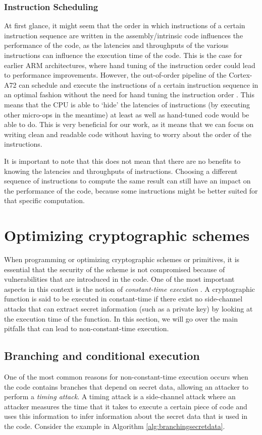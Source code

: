 \documentclass[11pt,a4paper]{report}
\theoremstyle{definition}
\begin{document}
\subsubsection{Instruction Scheduling}
At first glance, it might seem that the order in which instructions of a certain instruction sequence are written in the assembly/intrinsic code influences the performance of the code, as the latencies and throughputs of the various instructions can influence the execution time of the code. This is the case for earlier ARM architectures, where hand tuning of the instruction order could lead to performance improvements. However, the out-of-order pipeline of the Cortex-A72 can schedule and execute the instructions of a certain instruction sequence in an optimal fashion without the need for hand tuning the instruction order \cite{CortexA72OptGuide}. This means that the CPU is able to `hide' the latencies of instructions (by executing other micro-ops in the meantime) at least as well as hand-tuned code would be able to do. This is very beneficial for our work, as it means that we can focus on writing clean and readable code without having to worry about the order of the instructions.

It is important to note that this does not mean that there are no benefits to knowing the latencies and throughputs of instructions. Choosing a different sequence of instructions to compute the same result can still have an impact on the performance of the code, because some instructions might be better suited for that specific computation.

\section{Optimizing cryptographic schemes}
\label{sec:optimizingcrypto}
When programming or optimizing cryptographic schemes or primitives, it is essential that the security of the scheme is not compromised because of vulnerabilities that are introduced in the code. One of the most important aspects in this context is the notion of \textit{constant-time execution} \cite{kocher1996timing}. A cryptographic function is said to be executed in constant-time if there exist no side-channel attacks that can extract secret information (such as a private key) by looking at the execution time of the function. In this section, we will go over the main pitfalls that can lead to non-constant-time execution.

\subsection{Branching and conditional execution}
\label{sec:branching}
One of the most common reasons for non-constant-time execution occurs when the code contains branches that depend on secret data, allowing an attacker to perform a \textit{timing attack}. A timing attack is a side-channel attack where an attacker measures the time that it takes to execute a certain piece of code and uses this information to infer information about the secret data that is used in the code. Consider the example in Algorithm \ref{alg:branchingsecretdata}.
\end{document}
